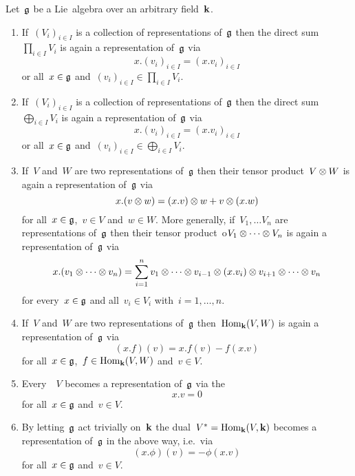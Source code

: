 \begin{proposition}\label{prop: new representations from old ones}
  Let~$\mathfrak{g}$ be a Lie~algebra over an arbitrary field~$\kf$.
  \begin{enumerate}[leftmargin=*]
    \item
      If~$(V_i)_{i \in I}$ is a collection of representations of~$\mathfrak{g}$ then the direct sum~$\prod_{i \in I} V_i$ is again a representation of~$\mathfrak{g}$ via
      \[
        x.(v_i)_{i \in I}
        =
        ( x.v_i )_{i \in I}
      \]
      or all~$x \in \mathfrak{g}$ and~$(v_i)_{i \in I} \in \prod_{i \in I} V_i$.
    \item
      If~$(V_i)_{i \in I}$ is a collection of representations of~$\mathfrak{g}$ then the direct sum~$\bigoplus_{i \in I} V_i$ is again a representation of~$\mathfrak{g}$ via
      \[
        x.(v_i)_{i \in I}
        =
        ( x.v_i )_{i \in I}
      \]
      or all~$x \in \mathfrak{g}$ and~$(v_i)_{i \in I} \in \bigoplus_{i \in I} V_i$.
    \item
      If~$V$ and~$W$ are two representations of~$\mathfrak{g}$ then their tensor product~$V \otimes W$ is again a representation of~$\mathfrak{g}$ via
      \[
        x.(v \otimes w)
        =
        (x.v) \otimes w + v \otimes (x.w)
      \]
      for all~$x \in \mathfrak{g}$,~$v \in V$ and~$w \in W$.
      More generally, if~$V_1, \dotsc V_n$ are representations of~$\mathfrak{g}$ then their tensor product~o$V_1 \otimes \dotsb \otimes V_n$ is again a representation of~$\mathfrak{g}$ via
      \[
        x.(v_1 \otimes \dotsb \otimes v_n)
        = \sum_{i=1}^n
                  v_1
          \otimes \dotsb
          \otimes v_{i-1}
          \otimes (x.v_i)
          \otimes v_{i+1}
          \otimes \dotsb
          \otimes v_n
      \]
      for every~$x \in \mathfrak{g}$ and all~$v_i \in V_i$ with~$i = 1, \dotsc, n$.
    \item
      If~$V$ and~$W$ are two representations of~$\mathfrak{g}$ then~$\operatorname{Hom}_{\mathbf{k}}(V,W)$ is again a representation of~$\mathfrak{g}$ via
      \[
        (x.f)(v)
        =
        x.f(v) - f(x.v)
      \]
      for all~$x \in \mathfrak{g}$,~$f \in \operatorname{Hom}_{\mathbf{k}}(V,W)$ and~$v \in V$.
    \item
      Every~{\vectorspace{$\kf$}}~$V$ becomes a representation of~$\mathfrak{g}$ via the 
      \[
        x.v
        =
        0
      \]
      for all~$x \in \mathfrak{g}$ and~$v \in V$.
    \item
      By letting~$\mathfrak{g}$ act trivially on~$\kf$ the dual~$V^* = \operatorname{Hom}_{\mathbf{k}}(V, \mathbf{k})$ becomes a representation of~$\mathfrak{g}$ in the above way, i.e.\ via
      \[
        (x.\phi)(v)
        =
        -\phi(x.v)
      \]
      for all~$x \in \mathfrak{g}$ and~$v \in V$.
  \end{enumerate}
\end{proposition}


